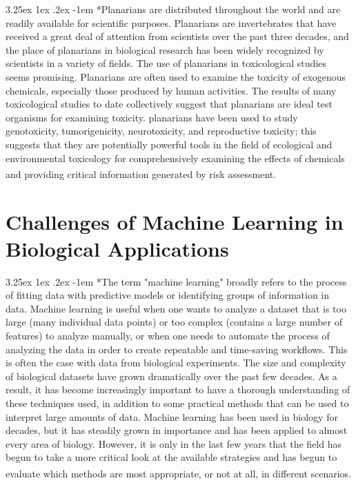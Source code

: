 \documentclass{article}
\makeatletter
\renewcommand\paragraph{\@startsection{paragraph}{4}{\z@}%
	{3.25ex \@plus1ex \@minus.2ex}%
	{-1em}%
	{\normalfont\normalsize}}
\makeatother
\begin{document}
		\paragraph*{Planarians are distributed throughout the world and are readily available for scientific purposes. Planarians are invertebrates that have received a great deal of attention from scientists over the past three decades, and the place of planarians in biological research has been widely recognized by scientists in a variety of fields. The use of planarians in toxicological studies seems promising. Planarians are often used to examine the toxicity of exogenous chemicals, especially those produced by human activities. The results of many toxicological studies to date collectively suggest that planarians are ideal test organisms for examining toxicity. planarians have been used to study genotoxicity, tumorigenicity, neurotoxicity, and reproductive toxicity; this suggests that they are potentially powerful tools in the field of ecological and environmental toxicology for comprehensively examining the effects of chemicals and providing critical information generated by risk assessment\textsuperscript{\cite{ref4}}.}
		
		\section*{Challenges of Machine Learning in Biological Applications}
		
		\paragraph*{The term "machine learning" broadly refers to the process of fitting data with predictive models or identifying groups of information in data. Machine learning is useful when one wants to analyze a dataset that is too large (many individual data points) or too complex (contains a large number of features) to analyze manually, or when one needs to automate the process of analyzing the data in order to create repeatable and time-saving workflows. This is often the case with data from biological experiments. The size and complexity of biological datasets have grown dramatically over the past few decades. As a result, it has become increasingly important to have a thorough understanding of these techniques used, in addition to some practical methods that can be used to interpret large amounts of data. Machine learning has been used in biology for decades, but it has steadily grown in importance and has been applied to almost every area of biology. However, it is only in the last few years that the field has begun to take a more critical look at the available strategies and has begun to evaluate which methods are most appropriate, or not at all, in different scenarios\textsuperscript{\cite{ref5}}.}
		
\end{document}
